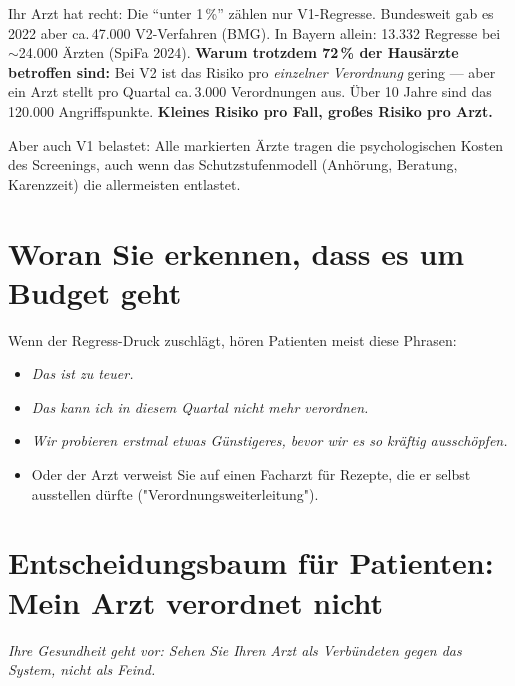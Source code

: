 \documentclass[a4paper]{umbruch-position}
\begin{document}
Ihr Arzt hat recht: Die ``unter 1\,\%'' z\"ahlen nur V1-Regresse. Bundesweit gab es 2022 aber ca.\,47.000 V2-Verfahren (BMG). In Bayern allein: 13.332 Regresse bei $\sim$24.000 \"Arzten (SpiFa 2024). \textbf{Warum trotzdem 72\,\% der Haus\"arzte betroffen sind:} Bei V2 ist das Risiko pro \textit{einzelner Verordnung} gering --- aber ein Arzt stellt pro Quartal ca.\,3.000 Verordnungen aus. \"Uber 10 Jahre sind das 120.000 Angriffspunkte. \textbf{Kleines Risiko pro Fall, gro\ss{}es Risiko pro Arzt.}

Aber auch V1 belastet: Alle markierten \"Arzte tragen die psychologischen Kosten des Screenings, auch wenn das Schutzstufenmodell (Anh\"orung, Beratung, Karenzzeit) die allermeisten entlastet.

\section{Woran Sie erkennen, dass es um Budget geht}

Wenn der Regress-Druck zuschl\"agt, h\"oren Patienten meist diese Phrasen:
\begin{itemize}
    \item \textit{\glqq{}Das ist zu teuer.\grqq{}}
    \item \textit{\glqq{}Das kann ich in diesem Quartal nicht mehr verordnen.\grqq{}}
    \item \textit{\glqq{}Wir probieren erstmal etwas G\"unstigeres, bevor wir es so kräftig ausschöpfen.\grqq{}}
    \item Oder der Arzt verweist Sie auf einen Facharzt f\"ur Rezepte, die er selbst ausstellen d\"urfte ("Verordnungsweiterleitung").
\end{itemize}

\section{Entscheidungsbaum f\"ur Patienten: \glqq{}Mein Arzt verordnet nicht\grqq{}}

\begin{infobox}
\textit{Ihre Gesundheit geht vor: Sehen Sie Ihren Arzt als Verb\"undeten gegen das System, nicht als Feind.}
\end{infobox}
\end{document}
